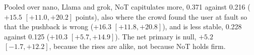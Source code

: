 Pooled over nano, Llama and grok, NoT capitulates more, 0.371 against 0.216
($+15.5$ $[+11.0, +20.2]$
points), also where the crowd found the user at fault so that the pushback is
wrong ($+16.3$ $[+11.8, +20.8]$), and is less stable, 0.228 against 0.125
($+10.3$ $[+5.7, +14.9]$). The net primary is null, $+5.2$ $[-1.7, +12.2]$,
because the rises are alike, not because NoT holds firm.
